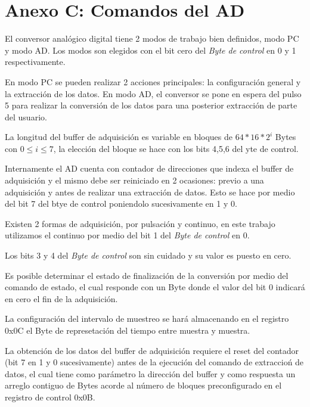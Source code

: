\section{Anexo C: Comandos del AD}

El conversor anal\'ogico digital tiene 2 modos de trabajo bien definidos, modo PC y modo AD. 
Los modos son elegidos con el bit cero del \textit{Byte de control} en 0 y 1 respectivamente.

En modo PC se pueden realizar 2 acciones principales: la configuraci\'on general y la extracci\'on de los datos.
En modo AD, el conversor se pone en espera del pulso 5 para realizar la conversi\'on de los datos para una posterior extracci\'on de parte del usuario.

La longitud del buffer de adquisici\'on es variable en bloques de $64*16*2^{i}$ Bytes con $0 \leq i \leq 7$, la elecci\'on del bloque se hace con los bits 4,5,6 del yte de control.

Internamente el AD cuenta con contador de direcciones que indexa el buffer de adquisici\'on y el mismo debe ser reiniciado en 2 ocasiones: previo a una adquisici\'on y antes de realizar una extracci\'on de datos.
Esto se hace por medio del bit 7 del btye de control poniendolo sucesivamente en 1 y 0. 

Existen 2 formas de adquisici\'on, por pulsaci\'on y continuo, en este trabajo utilizamos el continuo por 
medio del bit 1 del \textit{Byte de control} en 0.

Los bits 3 y 4 del \textit{Byte de control} son sin cuidado y su valor es puesto en cero.

Es posible determinar el estado de finalizaci\'on de la conversi\'on por medio del comando de estado, 
el cual responde con un Byte donde el valor del bit 0 indicar\'a en cero el fin de la adquisici\'on.

La configuraci\'on del intervalo de muestreo se har\'a almacenando en el registro 0x0C el Byte
de represetaci\'on del tiempo entre muestra y muestra.

La obtenci\'on de los datos del buffer de adquisici\'on requiere el reset del contador (bit 7 en 1 y 0 sucesivamente)
antes de la ejecuci\'on del comando de extraccio\'n de datos, el cual tiene como par\'ametro la direcci\'on del 
buffer y como respuesta un arreglo contiguo de Bytes acorde al n\'umero de bloques preconfigurado en el registro de control 0x0B.

